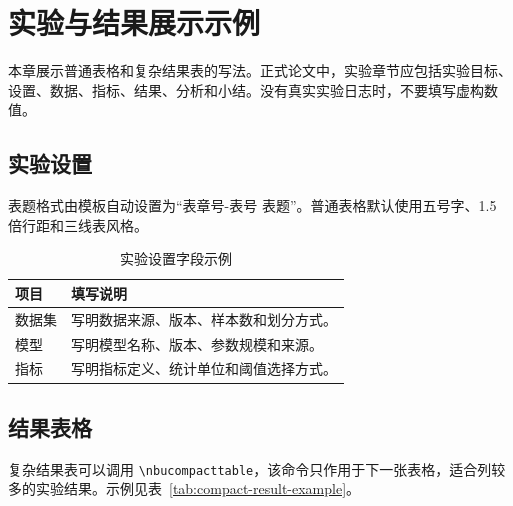 \chapter{实验与结果展示示例}
\label{chap:experiment-example}

本章展示普通表格和复杂结果表的写法。正式论文中，实验章节应包括实验目标、设置、数据、指标、结果、分析和小结。没有真实实验日志时，不要填写虚构数值。

\section{实验设置}
\label{sec:experiment-setup}

表题格式由模板自动设置为“表章号-表号  表题”。普通表格默认使用五号字、1.5 倍行距和三线表风格。

\begin{table}[htbp]
  \centering
  \caption{实验设置字段示例}
  \label{tab:setup-example}
  \begin{tabular}{C{0.25\textwidth}P{0.55\textwidth}}
    \toprule
    项目 & 填写说明 \\
    \midrule
    数据集 & 写明数据来源、版本、样本数和划分方式。 \\
    模型 & 写明模型名称、版本、参数规模和来源。 \\
    指标 & 写明指标定义、统计单位和阈值选择方式。 \\
    \bottomrule
  \end{tabular}
\end{table}

\section{结果表格}
\label{sec:result-table}

复杂结果表可以调用 \verb|\nbucompacttable|，该命令只作用于下一张表格，适合列较多的实验结果。示例见表~\ref{tab:compact-result-example}。


